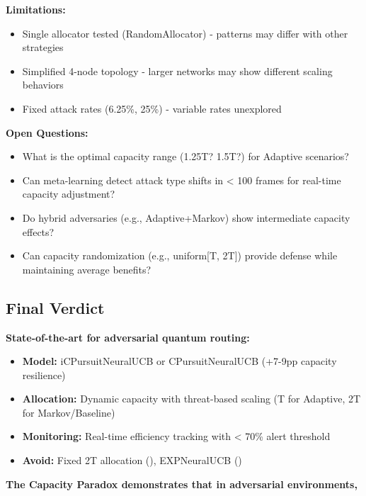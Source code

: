 \textbf{Limitations:}
\begin{itemize}
    \vspace{-0.2cm}
    \item Single allocator tested (RandomAllocator) - patterns may differ with other strategies
    \vspace{-0.2cm}
    \item Simplified 4-node topology - larger networks may show different scaling behaviors
    \vspace{-0.2cm}
    \item Fixed attack rates (6.25\%, 25\%) - variable rates unexplored
\end{itemize}

\textbf{Open Questions:}
\begin{itemize}
    \vspace{-0.2cm}
    \item What is the optimal capacity range (1.25T? 1.5T?) for Adaptive scenarios?
    \vspace{-0.2cm}
    \item Can meta-learning detect attack type shifts in < 100 frames for real-time capacity adjustment?
    \vspace{-0.2cm}
    \item Do hybrid adversaries (e.g., Adaptive+Markov) show intermediate capacity effects?
    \vspace{-0.2cm}
    \item Can capacity randomization (e.g., uniform[T, 2T]) provide defense while maintaining average benefits?
\end{itemize}

\subsection{Final Verdict}

\textbf{State-of-the-art for adversarial quantum routing:}
\begin{itemize}
    \vspace{-0.2cm}
    \item \textbf{Model:} iCPursuitNeuralUCB or CPursuitNeuralUCB (+7-9pp capacity resilience)
    \vspace{-0.2cm}
    \item \textbf{Allocation:} Dynamic capacity with threat-based scaling (T for Adaptive, 2T for Markov/Baseline)
    \vspace{-0.2cm}
    \item \textbf{Monitoring:} Real-time efficiency tracking with < 70\% alert threshold
    \vspace{-0.2cm}
    \item \textbf{Avoid:} Fixed 2T allocation (), EXPNeuralUCB ()
\end{itemize}

\vspace{0.3cm}
\begin{center}
\textbf{The Capacity Paradox demonstrates that in adversarial environments, \\
}
\end{center}


